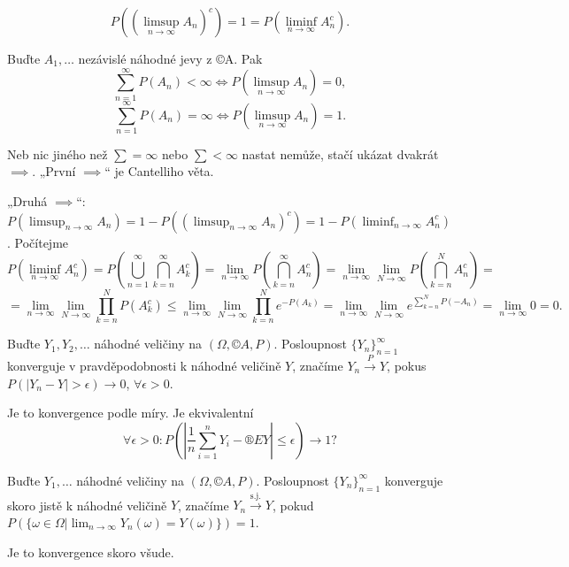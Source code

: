 \documentclass[12pt]{article}					%
\begin{document}
\begin{dusledek}
	$$ P((\limsup_{n\rightarrow ∞} A_n)^c) = 1 = P(\liminf_{n \rightarrow ∞} A_n^c). $$
\end{dusledek}

\begin{veta}
	Buďte $A_1, …$ nezávislé náhodné jevy z ©A. Pak
	$$ \sum_{n=1}^∞ P(A_n) < ∞ \Leftrightarrow P(\limsup_{n \rightarrow ∞} A_n) = 0, $$
	$$ \sum_{n=1}^∞ P(A_n) = ∞ \Leftrightarrow P(\limsup_{n \rightarrow ∞} A_n) = 1. $$

	\begin{dukazin}
		Neb nic jiného než $\sum = ∞$ nebo $\sum < ∞$ nastat nemůže, stačí ukázat dvakrát $\implies$. „První $\implies$“ je Cantelliho věta.

		„Druhá $\implies$“: $P(\limsup_{n \rightarrow ∞} A_n) = 1 - P((\limsup_{n \rightarrow ∞} A_n)^c) = 1 - P(\liminf_{n \rightarrow ∞} A_n^c)$. Počítejme
		$$ P(\liminf_{n \rightarrow ∞} A_n^c) = P(\bigcup_{n=1}^∞ \bigcap_{k=n}^∞ A_k^c) = \lim_{n \rightarrow ∞} P(\bigcap_{k=n}^∞ A_n^c) = \lim_{n \rightarrow ∞} \lim_{N \rightarrow ∞} P(\bigcap_{k=n}^N A_n^c) = $$
		$$ = \lim_{n \rightarrow ∞} \lim_{N \rightarrow ∞} \prod_{k=n}^N P(A_k^c) ≤ \lim_{n \rightarrow ∞} \lim_{N \rightarrow ∞} \prod_{k=n}^N e^{-P(A_k)} = \lim_{n \rightarrow ∞} \lim_{N \rightarrow ∞} e^{\sum_{k=n}^N P(-A_n)} = \lim_{n \rightarrow ∞} 0 = 0. $$
	\end{dukazin}
\end{veta}


\begin{definice}
	Buďte $Y_1, Y_2, …$ náhodné veličiny na $(\Omega, ©A, P)$. Posloupnost $\{Y_n\}_{n = 1}^∞$ konverguje v pravděpodobnosti k náhodné veličině $Y$, značíme $Y_n \overset{P}{\rightarrow} Y$, pokus $P(|Y_n - Y| > \epsilon) \rightarrow 0$, $\forall \epsilon > 0$.

	\begin{poznamkain}
		Je to konvergence podle míry. Je ekvivalentní
		$$ \forall \epsilon > 0: P(|\frac{1}{n} \sum_{i=1}^n Y_i - ®E Y| ≤ \epsilon) \rightarrow 1? $$
	\end{poznamkain}
\end{definice}

\begin{definice}
	Buďte $Y_1, …$ náhodné veličiny na $(\Omega, ©A, P)$. Posloupnost $\{Y_n\}_{n=1}^∞$ konverguje skoro jistě k náhodné veličině $Y$, značíme $Y_n \overset{\text{s.j.}}\rightarrow Y$, pokud $P(\{\omega \in \Omega | \lim_{n \rightarrow ∞}Y_n(\omega) = Y(\omega)\}) = 1$.

	\begin{poznamkain}
		Je to konvergence skoro všude.
	\end{poznamkain}
\end{definice}
\end{document}
